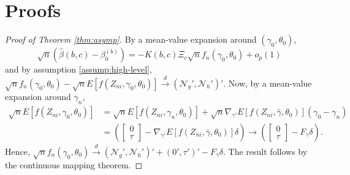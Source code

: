 \section{Proofs}
\begin{proof}[Proof of Theorem \ref{thm:asymp}]
By a mean-value expansion around $(\gamma_0,\theta_0)$,
	$$\sqrt{n}\left(\widehat{\beta}(b,c) - \beta_0^{(b)}\right) = - K(b,c)\Xi_c \sqrt{n} f_n(\gamma_0,\theta_0) + o_p(1)$$
  and by assumption \ref{assump:high-level},
$\sqrt{n} f_n(\gamma_0,\theta_0) - \sqrt{n}E\left[f(Z_{ni},\gamma_0,\theta_0) \right]\overset{d}{\rightarrow} (\mathscr{N}_g', \mathscr{N}_h')'$. 
Now, by a mean-value expansion around $\gamma_n$,
	\begin{align*}
		\sqrt{n}E\left[ f(Z_{ni}, \gamma_0, \theta_0) \right] &= \sqrt{n}E\left[ f(Z_{ni}, \gamma_n,\theta_0) \right] + \sqrt{n}\nabla_{\gamma'}E\left[ f(Z_{ni}, \bar{\gamma},\theta_0) \right] (\gamma_0 -\gamma_n)\\
			&=\left(\left[ \begin{array}{c} 0\\ \tau\end{array}\right] - \nabla_{\gamma'}E\left[ f(Z_{ni}, \bar{\gamma},\theta_0) \right] \delta\right) \rightarrow \left(\left[ \begin{array}{c} 0\\ \tau\end{array}\right] - F_\gamma\delta\right).
	\end{align*}
  Hence, $\sqrt{n}f_n(\gamma_0, \theta_0) \overset{d}{\rightarrow} (\mathscr{N}_g', \mathscr{N}_h')' + (0', \tau')' - F_\gamma \delta$.
  The result follows by the continuous mapping theorem.
\end{proof}

